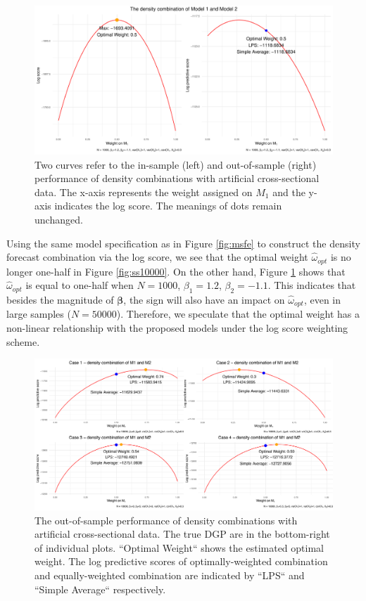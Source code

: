 \documentclass{monashthesis}
\begin{document}
\begin{figure}[ht]
\centering
\includegraphics[scale=0.6]{figures/LPS_1000.pdf}
\caption{Two curves refer to the in-sample (left) and out-of-sample (right) performance of density combinations with artificial cross-sectional data. The x-axis represents the weight assigned on $M_1$ and the y-axis indicates the log score. The meanings of dots remain unchanged.}
\label{fig:ss1000}
\end{figure}

Using the same model specification as in Figure \ref{fig:msfe} to construct the density forecast combination via the log score, we see that the optimal weight \(\hat\omega_{opt}\) is no longer one-half in Figure \ref{fig:ss10000}. On the other hand, Figure \ref{fig:ss1000} shows that \(\hat\omega_{opt}\) is equal to one-half when \(N = 1000\), \(\beta_1=1.2\), \(\beta_2=-1.1\). This indicates that besides the magnitude of \(\pmb{\beta}\), the sign will also have an impact on \(\hat\omega_{opt}\), even in large samples (\(N = 50000\)). Therefore, we speculate that the optimal weight has a non-linear relationship with the proposed models under the log score weighting scheme.

\begin{figure}[ht]
\centering
\includegraphics[scale=0.53]{figures/con_cases.png}
\caption{The out-of-sample performance of density combinations with artificial cross-sectional data. The true DGP are in the bottom-right of individual plots. ``Optimal Weight`` shows the estimated optimal weight. The log predictive scores of optimally-weighted combination and equally-weighted combination are indicated by ``LPS`` and ``Simple Average`` respectively.}
\label{fig:cases}
\end{figure}
\end{document}
